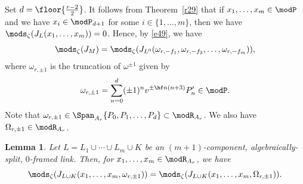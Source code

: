 \documentclass{amsart}
\numberwithin{equation}{section}
\numberwithin{figure}{section}
\theoremstyle{plain}
\newtheorem{lemma}[theorem]{Lemma}
\theoremstyle{definition}
\theoremstyle{remark}
\begin{document}
Set $d=\floor{\frac{r-2}{2}}$.  It follows from Theorem~\ref{r29} that
if $x_1,\ldots,x_m\in \modP $ and we have $x_i\in \modP _{d+1}$ for some
$i\in \{1,\ldots,m\}$, then we have $\mods _\zeta (J_L(x_1,\ldots,x_m))=0$.  Hence, by
\eqref{e49}, we have
\begin{equation*}
  \mods _\zeta (J_M)= \mods _\zeta (J_{L^0}(\omega _{r,-f_1},\omega _{r,-f_2},\ldots,\omega _{r,-f_m})),
\end{equation*}
where $\omega _{r,\pm 1}$ is the truncation of $\omega ^{\pm 1}$ given by
\begin{equation*}
  \omega _{r,\pm 1} =\sum_{n=0}^d(\pm 1)^n v^{\pm \hf n(n+3)}P'_n\in \modP .
\end{equation*}
Note that $\omega _{r,\pm 1} \in \Span_{A_r}\{P_0,P_1,\ldots,P_{d}\}\subset \modR _{A_r}$.
We also have $\Omega _{r,\pm 1}\in \modR _{A_r}$.

\begin{lemma}
  \label{r34}
  Let $L=L_1\cup \cdots\cup L_m\cup K$ be an $(m+1)$-component,
  algebraically-split, $0$-framed link.  Then, for
  $x_1,\ldots,x_m\in \modR _{A_r}$, we have
  \begin{equation}
    \label{e52}
    \mods _\zeta (J_{L\cup K}(x_1,\ldots,x_m,\omega _{r,\pm 1})) =
    \mods _\zeta (J_{L\cup K}(x_1,\ldots,x_m,\Omega _{r,\pm 1})).
  \end{equation}
\end{lemma}
\end{document}
